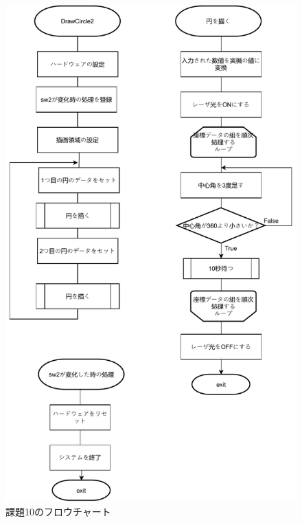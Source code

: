 \documentclass{jarticle}
\begin{document}
\begin{figure}[H]
    \centering
    \includegraphics{kumikomiKadai10.pdf}
    \caption{課題10のフロウチャート}
    \label{fig:my_label}
\end{figure}
\end{document}
